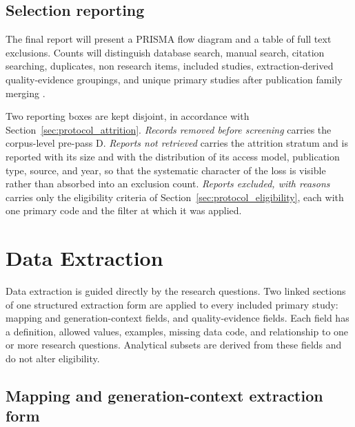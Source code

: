 \subsection{Selection reporting}

The final report will present a PRISMA flow diagram and a table of full text exclusions. Counts will distinguish database search, manual search, citation searching, duplicates, non research items, included studies, extraction-derived quality-evidence groupings, and unique primary studies after publication family merging \cite{Page2021PRISMA}.

Two reporting boxes are kept disjoint, in accordance with Section~\ref{sec:protocol_attrition}. \textit{Records removed before screening} carries the corpus-level pre-pass D. \textit{Reports not retrieved} carries the attrition stratum and is reported with its size and with the distribution of its access model, publication type, source, and year, so that the systematic character of the loss is visible rather than absorbed into an exclusion count. \textit{Reports excluded, with reasons} carries only the eligibility criteria of Section~\ref{sec:protocol_eligibility}, each with one primary code and the filter at which it was applied.

\section{Data Extraction}
\label{sec:protocol_extraction}

Data extraction is guided directly by the research questions. Two linked sections of one structured extraction form are applied to every included primary study: mapping and generation-context fields, and quality-evidence fields. Each field has a definition, allowed values, examples, missing data code, and relationship to one or more research questions. Analytical subsets are derived from these fields and do not alter eligibility.

\subsection{Mapping and generation-context extraction form}

